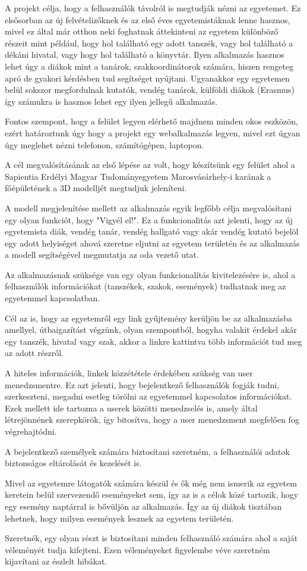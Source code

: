 A projekt célja, hogy a felhasználók távolról is megtudják nézni az egyetemet. Ez elsősorban az új felvételizőknek és az első éves egyetemistáknak lenne hasznos, mivel ez által már otthon neki foghatnak áttekinteni az egyetem különböző részeit mint például, hogy hol található egy adott tanszék, vagy hol található a dékáni hivatal, vagy hogy hol található a könyvtár. Ilyen alkalmazás hasznos lehet úgy a diákok mint a tanárok, szakkoordinátorok számára, hiszen rengeteg apró de gyakori kérdésben tud segítséget nyújtani. Ugyanakkor egy egyetemen belül sokszor megfordulnak kutatók, vendég tanárok, külföldi diákok (Erasmus) így számukra is hasznos lehet egy ilyen jellegű alkalmazás.

Fontos szempont, hogy a felület legyen elérhető majdnem minden okos eszközön, ezért határoztunk úgy hogy a projekt egy webalkalmazás legyen, mivel ezt úgyan úgy meglehet nézni telefonon, számítógépen, laptopon.

A cél megvalósításának az első lépése az volt, hogy készítsünk egy felület ahol a Sapientia Erdélyi Magyar Tudományegyetem Marosvásárhely-i karának a főépületének a 3D modelljét megtudjuk jeleníteni.

A modell megjelenítése mellett az alkalmazás egyik legfőbb célja megvalósítani egy olyan funkciót, hogy "Vigyél el!". Ez a funkcionalitás azt jelenti, hogy az új egyetemista diák, vendég tanár, vendég hallgató vagy akár vendég kutató bejelöl egy adott helyiséget ahová szeretne eljutni az egyetem területén és az alkalmazás a modell segítségével megmutatja az oda vezető utat.

Az alkalmazásnak szüksége van egy olyan funkcionalítás kivitelezésére is, ahol a felhasználók információkat (tanszékek, szakok, események) tudhatnak meg az egyetemmel kapcsolatban.

Cél az is, hogy az egyetemről egy link gyűjtemény kerüljön be az alkalmazásba amellyel, útbaigazítást végzünk, olyan szempontból, hogyha valakit érdekel akár egy tanszék, hivatal vagy szak, akkor a linkre kattintva több információt tud meg az adott részről.

A hiteles információk, linkek közzététele érdekében szükség van user menedzsmentre. Ez azt jelenti, hogy bejelentkező felhasználók fogják tudni, szerkeszteni, megadni esetleg törölni az egyetemmel kapcsolatos információkat. Ezek mellett ide tartozna a userek közötti menedzselés is, amely által létrejönnének szerepkörök, így bitosítva, hogy a user menedzsment megfelően fog végrehajtódni.

A bejelentkező személyek számára biztosítani szeretném, a felhasználói adatok biztonságos eltárolását és kezelését is.

Mivel az egyetemre látogatók számára készül és ők még nem ismerik az egyetem keretein belül szervezendő eseményeket sem, így az is a célok közé tartozik, hogy egy esemény naptárral is bővüljön az alkalmazás. Így az új diákok tisztában lehetnek, hogy milyen események lesznek az egyetem területén.

Szeretnék, egy olyan részt is biztosítani minden felhasználó számára ahol a saját véleményét tudja kifejteni. Ezen véleményeket figyelembe véve szeretném kijavítani az észlelt hibákat.